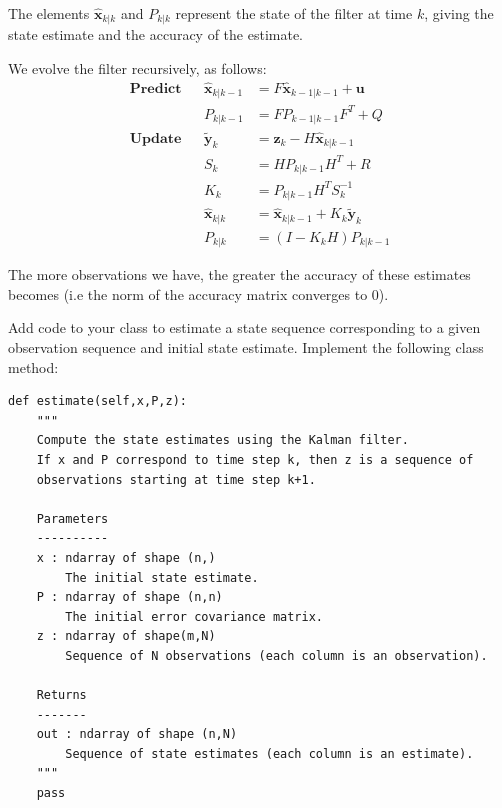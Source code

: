 The elements $\widehat{\mathbf{x}}_{k|k}$ and $P_{k|k}$ represent the state of the filter at time $k$, giving the state estimate and the accuracy of the estimate.


We evolve the filter recursively, as follows:
\begin{align*}
\textbf{Predict} & & \widehat{\mathbf{x}}_{k|k-1} & = F\widehat{\mathbf{x}}_{k-1|k-1} + \mathbf{u} \\
 & & P_{k|k-1} & = FP_{k-1|k-1}F^{T} + Q \\
\textbf{Update} & & \tilde{\mathbf{y}}_{k} & = \mathbf{z}_{k} - H\widehat{\mathbf{x}}_{k|k-1} \\
 & & S_{k} & = HP_{k|k-1}H^{T} + R \\
 & & K_{k} & = P_{k|k-1}H^{T}S_{k}^{-1} \\
 & & \widehat{\mathbf{x}}_{k|k} & = \widehat{\mathbf{x}}_{k|k-1} + K_{k}\tilde{\mathbf{y}}_{k} \\
 & & P_{k|k} & = (I - K_{k}H)P_{k|k-1}
\end{align*}

The more observations we have, the greater the accuracy of these estimates becomes (i.e the norm of the accuracy matrix converges to $0$).

\begin{problem}
Add code to your  class to estimate a state sequence corresponding to a given observation sequence and initial state estimate.
Implement the following class method:
\begin{lstlisting}
def estimate(self,x,P,z):
    """
    Compute the state estimates using the Kalman filter.
    If x and P correspond to time step k, then z is a sequence of
    observations starting at time step k+1.

    Parameters
    ----------
    x : ndarray of shape (n,)
        The initial state estimate.
    P : ndarray of shape (n,n)
        The initial error covariance matrix.
    z : ndarray of shape(m,N)
        Sequence of N observations (each column is an observation).

    Returns
    -------
    out : ndarray of shape (n,N)
        Sequence of state estimates (each column is an estimate).
    """
    pass
\end{lstlisting}
\end{problem}

